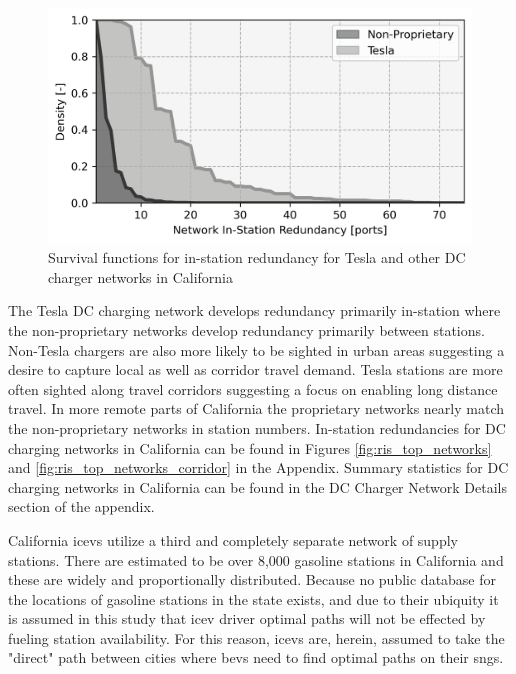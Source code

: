 \begin{multicols}{2}
\begin{figure}[H]
	\centering
	\includegraphics[width = \linewidth]{figs/California_RIS_Hist.png}
	\caption{Survival functions for in-station redundancy for Tesla and other DC charger networks in California}
	\label{fig:network_histograms}
\end{figure}

The Tesla DC charging network develops redundancy primarily in-station where the non-proprietary networks develop redundancy primarily between stations. Non-Tesla chargers are also more likely to be sighted in urban areas suggesting a desire to capture local as well as corridor travel demand. Tesla stations are more often sighted along travel corridors suggesting a focus on enabling long distance travel. In more remote parts of California the proprietary networks nearly match the non-proprietary networks in station numbers. In-station redundancies for DC charging networks in California can be found in Figures \ref{fig:ris_top_networks} and \ref{fig:ris_top_networks_corridor} in the Appendix. Summary statistics for DC charging networks in California can be found in the DC Charger Network Details section of the appendix.

California \glspl{icev} utilize a third and completely separate network of supply stations. There are estimated to be over 8,000 gasoline stations in California \cite{CEC_2022} and these are widely and proportionally distributed. Because no public database for the locations of gasoline stations in the state exists, and due to their ubiquity it is assumed in this study that \gls{icev} driver optimal paths will not be effected by fueling station availability. For this reason, \glspl{icev} are, herein, assumed to take the "direct" path between cities where \glspl{bev} need to find optimal paths on their \glspl{sng}.


\end{multicols}

